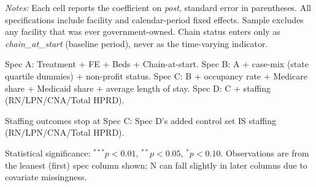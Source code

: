 \begin{table}[H]
\begin{threeparttable}
\begin{tablenotes}[flushleft]
\footnotesize
\item \textit{Notes:} Each cell reports the coefficient on \textit{post}, standard error in parentheses. All specifications include facility and calendar-period fixed effects. Sample excludes any facility that was ever government-owned. Chain status enters only as \textit{chain\_at\_start} (baseline period), never as the time-varying indicator.
\item Spec A: Treatment + FE + Beds + Chain-at-start. Spec B: A + case-mix (state quartile dummies) + non-profit status. Spec C: B + occupancy rate + Medicare share + Medicaid share + average length of stay. Spec D: C + staffing (RN/LPN/CNA/Total HPRD).
\item Staffing outcomes stop at Spec C: Spec D's added control set IS staffing (RN/LPN/CNA/Total HPRD).
\item Statistical significance: $^{***}p<0.01$, $^{**}p<0.05$, $^{*}p<0.10$. Observations are from the leanest (first) spec column shown; N can fall slightly in later columns due to covariate missingness.
\end{tablenotes}
\end{threeparttable}
\end{table}

